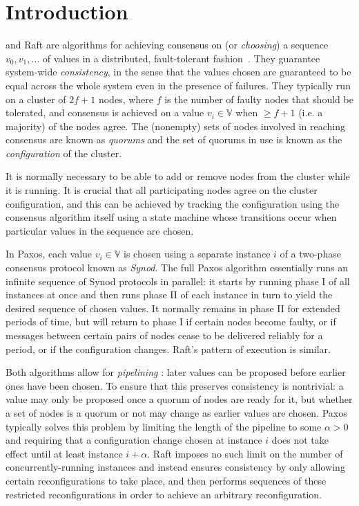 \documentclass[journal]{IEEEtran}
\begin{document}
\section{Introduction}

 and Raft are algorithms for achieving consensus on (or
\textit{choosing}) a sequence $v_0, v_1, \ldots$ of values in a distributed,
fault-tolerant fashion~\cite{part-time-parliament}. They guarantee system-wide
\textit{consistency}, in the sense that the values chosen are guaranteed to be
equal across the whole system even in the presence of failures. They typically
run on a cluster of $2f+1$ nodes, where $f$ is the number of faulty nodes that
should be tolerated, and consensus is achieved on a value $v_i \in \mathbb V$
when $\ge f+1$ (i.e. a majority) of the nodes agree. The (nonempty) sets of
nodes involved in reaching consensus are known as \textit{quorums} and the set
of quorums in use is known as the \textit{configuration} of the cluster.

It is normally necessary to be able to add or remove nodes from the cluster
while it is running. It is crucial that all participating nodes agree on the
cluster configuration, and this can be achieved by tracking the configuration
using the consensus algorithm itself using a state machine whose transitions
occur when particular values in the sequence are chosen.

In Paxos, each value $v_i \in \mathbb V$ is chosen using a separate instance
$i$ of a two-phase consensus protocol known as \textit{Synod}. The full Paxos
algorithm essentially runs an infinite sequence of Synod protocols in parallel:
it starts by running phase I of all instances at once and then runs phase II of
each instance in turn to yield the desired sequence of chosen values. It
normally remains in phase II for extended periods of time, but will return to
phase I if certain nodes become faulty, or if messages between certain pairs of
nodes cease to be delivered reliably for a period, or if the configuration
changes. Raft's pattern of execution is similar.

Both algorithms allow for \textit{pipelining} \cite{smart}: later values can be
proposed before earlier ones have been chosen. To ensure that this preserves
consistency is nontrivial: a value may only be proposed once a quorum of nodes
are ready for it, but whether a set of nodes is a quorum or not may change as
earlier values are chosen. Paxos typically solves this problem by limiting the
length of the pipeline to some $\alpha > 0$ and requiring that a configuration
change chosen at instance $i$ does not take effect until at least instance $i +
\alpha$.  Raft imposes no such limit on the number of concurrently-running
instances and instead ensures consistency by only allowing certain
reconfigurations to take place, and then performs sequences of these restricted
reconfigurations in order to achieve an arbitrary reconfiguration.
\end{document}
